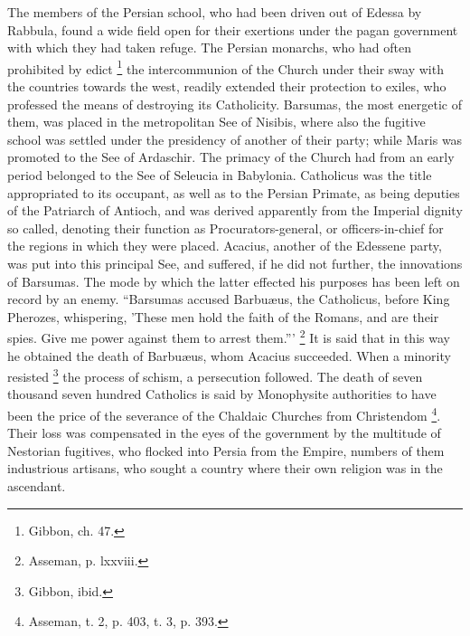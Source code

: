 The members of the Persian school, who had been driven out of
Edessa by Rabbula, found a wide field open for their exertions under
the pagan government with which they had taken refuge. The Persian
monarchs, who had often prohibited by edict \footnote{Gibbon, ch. 47.} the intercommunion of the Church under their sway with the
countries towards the west, readily extended their protection to
exiles, who professed the means of destroying its Catholicity.
Barsumas, the most energetic of them, was placed in the metropolitan
See of Nisibis, where also the fugitive school was settled under the
presidency of another of their party; while Maris was promoted to the
See of Ardaschir. The primacy of the Church had from an early period
belonged to the See of Seleucia in Babylonia. Catholicus was the title
appropriated to its occupant, as well as to the Persian Primate, as
being deputies of the Patriarch of Antioch, and was derived apparently
from the Imperial dignity so called, denoting their function as
Procurators-general, or officers-in-chief for the regions in which
they were placed. Acacius, another of the Edessene party, was put into
this principal See, and suffered, if he did not further, the
innovations of Barsumas. The mode by which the latter effected his
purposes has been left on record by an enemy. ``Barsumas accused
Barbuæus, the Catholicus, before King Pherozes, whispering, 'These
men hold the faith of the Romans, and are their spies. Give me power
against them to arrest them.''' \footnote{Asseman, p. lxxviii.} It is said that in this way he obtained the death of Barbuæus,
whom Acacius succeeded. When a minority resisted \footnote{Gibbon, ibid.} the process of schism, a persecution followed. The death of
seven thousand seven hundred Catholics is said by Monophysite
authorities to have been the price of the severance of the Chaldaic
Churches from Christendom \footnote{Asseman, t. 2, p. 403, t. 3, p. 393.}.
Their loss was compensated in the eyes of the government by the
multitude of Nestorian fugitives, who flocked into Persia from the
Empire, numbers of them industrious artisans, who sought a country
where their own religion was in the ascendant.

